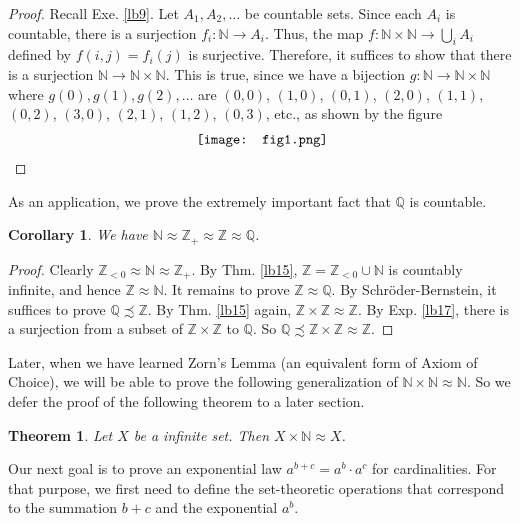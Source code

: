 \documentclass[12pt,b5paper,notitlepage]{article}
\theoremstyle{definition}
\theoremstyle{plain}
\newtheorem{thm}[df]{Theorem}
\newtheorem{co}[df]{Corollary}
\newcommand{\Nbb}{\mathbb N}
\newcommand{\Zbb}{\mathbb Z}
\newcommand{\Qbb}{\mathbb Q}
\numberwithin{equation}{section}
\begin{document}
\begin{proof}
Recall Exe. \ref{lb9}. Let $A_1,A_2,\dots$ be countable sets. Since each $A_i$ is countable, there is a surjection $f_i:\Nbb\rightarrow A_i$. Thus, the map $f:\Nbb\times\Nbb\rightarrow \bigcup_i A_i$ defined by $f(i,j)=f_i(j)$ is surjective. Therefore, it suffices to show that there is a surjection $\Nbb\rightarrow\Nbb\times\Nbb$. This is true, since we have a bijection $g:\Nbb\rightarrow\Nbb\times\Nbb$ where $g(0),g(1),g(2),\dots$ are $(0,0)$, $(1,0)$, $(0,1)$, $(2,0)$, $(1,1)$, $(0,2)$, $(3,0)$, $(2,1)$, $(1,2)$, $(0,3)$, etc., as shown by the figure
\begin{align*}
\vcenter{\hbox{{
			\texttt{[image: fig1.png]}}}}
\end{align*}
\end{proof}

As an application, we prove the extremely important fact that $\Qbb$ is countable.
\begin{co}
We have $\Nbb\approx\Zbb_+\approx\Zbb\approx \Qbb$.
\end{co}



\begin{proof}
Clearly $\Zbb_{<0}\approx\Nbb\approx \Zbb_+$. By Thm. \ref{lb15}, $\Zbb=\Zbb_{<0}\cup\Nbb$ is countably infinite, and hence $\Zbb\approx\Nbb$. It remains to prove $\Zbb\approx\Qbb$. By Schr\"oder-Bernstein, it suffices to prove $\Qbb\precsim\Zbb$.  By Thm. \ref{lb15} again, $\Zbb\times\Zbb\approx\Zbb$. By Exp. \ref{lb17}, there is a surjection from a subset of $\Zbb\times\Zbb$ to $\Qbb$. So $\Qbb\precsim\Zbb\times\Zbb\approx\Zbb$.
\end{proof}



Later, when we have learned Zorn's Lemma (an equivalent form of Axiom of Choice), we will be able to prove the following generalization of $\Nbb\times\Nbb\approx\Nbb$. So we defer the proof of the following theorem to a later section.

\begin{thm}\label{lb16}
Let $X$ be a infinite set. Then $X\times\Nbb\approx X$.
\end{thm}





Our next goal is to prove an exponential law $a^{b+c}=a^b\cdot a^c$ for cardinalities. For that purpose, we first need to define the set-theoretic operations that correspond to the summation $b+c$ and the exponential $a^b$.
\end{document}
